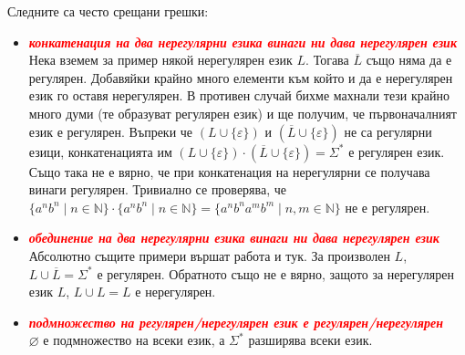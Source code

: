 \begin{warning}
    Следните са често срещани грешки:
    \begin{itemize}
        \item \textbf{\textit{\textcolor{red}{конкатенация на два нерегулярни езика винаги ни дава нерегулярен език}}} \\
              Нека вземем за пример някой нерегулярен език $L$.
              Тогава $\overline{L}$ също няма да е регулярен.
              Добавяйки крайно много елементи към който и да е нерегулярен език го оставя нерегулярен.
              В противен случай бихме махнали тези крайно много думи (те образуват регулярен език) и ще получим, че първоначалният език е регулярен.
              Въпреки че $(L \cup \{ \varepsilon \})$ и $(\overline{L} \cup \{ \varepsilon \})$ не са регулярни езици,
              конкатенацията им $(L \cup \{ \varepsilon \}) \cdot (\overline{L} \cup \{ \varepsilon \}) = \Sigma^*$ е регулярен език.
              Също така не е вярно, че при конкатенация на нерегулярни се получава винаги регулярен.
              Тривиално се проверява, че $\{ a^nb^n \mid n \in \mathbb{N} \} \cdot \{ a^nb^n \mid n \in \mathbb{N} \} = \{ a^nb^na^mb^m \mid n, m \in \mathbb{N} \}$ не е регулярен.

        \item \textbf{\textit{\textcolor{red}{обединение на два нерегулярни езика винаги ни дава нерегулярен език}}} \\
              Абсолютно същите примери вършат работа и тук.
              За произволен $L$, $L \cup \overline{L} = \Sigma^*$ е регулярен.
              Обратното също не е вярно, защото за нерегулярен език $L$, $L \cup L = L$ е нерегулярен.
        \item \textbf{\textit{\textcolor{red}{подмножество на регулярен/нерегулярен език е регулярен/нерегулярен}}} \\
              $\varnothing$ е подмножество на всеки език, а $\Sigma^*$ разширява всеки език.
    \end{itemize}
\end{warning}
